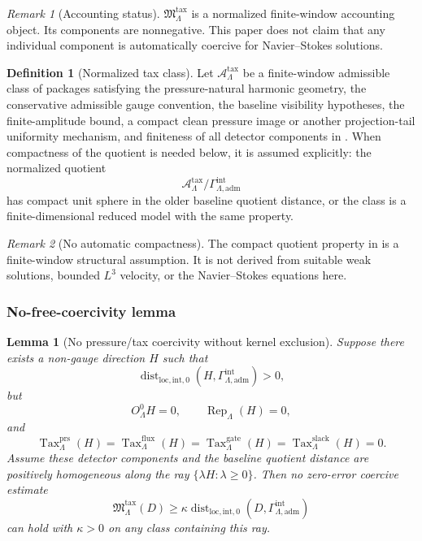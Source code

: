 \documentclass[11pt]{article}
\numberwithin{equation}{section}
\newtheorem{lemma}[lemma]{Lemma}
\theoremstyle{definition}
\newtheorem{definition}[definition]{Definition}
\theoremstyle{remark}
\newtheorem{remark}[remark]{Remark}
\newcommand{\loc}{\mathrm{loc}}
\newcommand{\intg}{\mathrm{int}}
\newcommand{\adm}{\mathrm{adm}}
\newcommand{\prs}{\mathrm{prs}}
\newcommand{\Dist}{\operatorname{dist}}
\newcommand{\Gammaadm}{\Gamma^{\intg}_{\Lambda,\adm}}
\begin{document}
\begin{remark}[Accounting status]
\(\mathfrak M^{\mathrm{tax}}_\Lambda\) is a normalized finite-window
accounting object.  Its components are nonnegative.  This paper does not
claim that any individual component is automatically coercive for
Navier--Stokes solutions.
\end{remark}

\begin{definition}[Normalized tax class]
\label{def:normalized-tax-class}
Let \(\mathcal A^{\mathrm{tax}}_\Lambda\) be a finite-window admissible class
of packages satisfying the pressure-natural harmonic geometry, the
conservative admissible gauge convention, the baseline visibility
hypotheses, the finite-amplitude bound, a compact clean pressure image or
another projection-tail uniformity mechanism, and finiteness of all detector
components in .  When compactness
of the quotient is needed below, it is assumed explicitly: the normalized
quotient
\[
    \mathcal A^{\mathrm{tax}}_\Lambda/\Gammaadm
\]
has compact unit sphere in the older baseline quotient distance, or the class
is a finite-dimensional reduced model with the same property.
\end{definition}

\begin{remark}[No automatic compactness]
The compact quotient property in  is a
finite-window structural assumption.  It is not derived from suitable weak
solutions, bounded \(L^3\) velocity, or the Navier--Stokes equations here.
\end{remark}

\subsubsection{No-free-coercivity lemma}

\begin{lemma}[No pressure/tax coercivity without kernel exclusion]
\label{lem:no-pressure-tax-coercivity-without-kernel}
Suppose there exists a non-gauge direction \(H\) such that
\[
    \Dist_{\loc,\intg,0}(H,\Gammaadm)>0,
\]
but
\[
    O^0_\Lambda H=0,\qquad
    \operatorname{Rep}_\Lambda(H)=0,
\]
and
\[
    \operatorname{Tax}^{\prs}_\Lambda(H)
    =
    \operatorname{Tax}^{\mathrm{flux}}_\Lambda(H)
    =
    \operatorname{Tax}^{\mathrm{gate}}_\Lambda(H)
    =
    \operatorname{Tax}^{\mathrm{slack}}_\Lambda(H)
    =
    0.
\]
Assume these detector components and the baseline quotient distance are
positively homogeneous along the ray \(\{\lambda H:\lambda\ge0\}\).  Then no
zero-error coercive estimate
\[
    \mathfrak M^{\mathrm{tax}}_\Lambda(D)
    \ge
    \kappa\Dist_{\loc,\intg,0}(D,\Gammaadm)
\]
can hold with \(\kappa>0\) on any class containing this ray.
\end{lemma}
\end{document}
